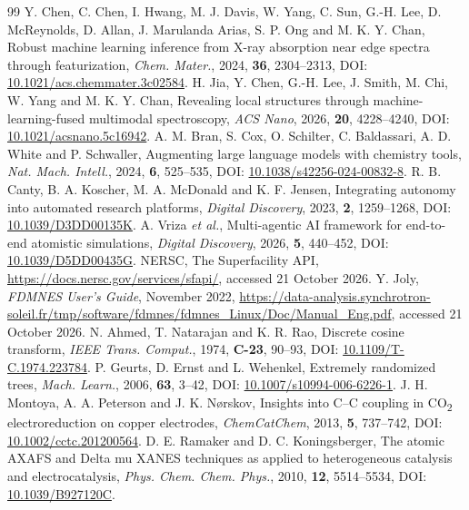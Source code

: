 \begin{thebibliography}{99}
 Y. Chen, C. Chen, I. Hwang, M. J. Davis, W. Yang, C. Sun, G.-H. Lee, D. McReynolds, D. Allan, J. Marulanda Arias, S. P. Ong and M. K. Y. Chan, Robust machine learning inference from X-ray absorption near edge spectra through featurization, \textit{Chem. Mater.}, 2024, \textbf{36}, 2304--2313, DOI: \href{https://doi.org/10.1021/acs.chemmater.3c02584}{10.1021/acs.chemmater.3c02584}.
 H. Jia, Y. Chen, G.-H. Lee, J. Smith, M. Chi, W. Yang and M. K. Y. Chan, Revealing local structures through machine-learning-fused multimodal spectroscopy, \textit{ACS Nano}, 2026, \textbf{20}, 4228--4240, DOI: \href{https://doi.org/10.1021/acsnano.5c16942}{10.1021/acsnano.5c16942}.
 A. M. Bran, S. Cox, O. Schilter, C. Baldassari, A. D. White and P. Schwaller, Augmenting large language models with chemistry tools, \textit{Nat. Mach. Intell.}, 2024, \textbf{6}, 525--535, DOI: \href{https://doi.org/10.1038/s42256-024-00832-8}{10.1038/s42256-024-00832-8}.
 R. B. Canty, B. A. Koscher, M. A. McDonald and K. F. Jensen, Integrating autonomy into automated research platforms, \textit{Digital Discovery}, 2023, \textbf{2}, 1259--1268, DOI: \href{https://doi.org/10.1039/D3DD00135K}{10.1039/D3DD00135K}.
 A. Vriza \textit{et al.}, Multi-agentic AI framework for end-to-end atomistic simulations, \textit{Digital Discovery}, 2026, \textbf{5}, 440--452, DOI: \href{https://doi.org/10.1039/D5DD00435G}{10.1039/D5DD00435G}.
 NERSC, The Superfacility API, \url{https://docs.nersc.gov/services/sfapi/}, accessed 21 October 2026.
 Y. Joly, \textit{FDMNES User's Guide}, November 2022, \url{https://data-analysis.synchrotron-soleil.fr/tmp/software/fdmnes/fdmnes_Linux/Doc/Manual_Eng.pdf}, accessed 21 October 2026.
 N. Ahmed, T. Natarajan and K. R. Rao, Discrete cosine transform, \textit{IEEE Trans. Comput.}, 1974, \textbf{C-23}, 90--93, DOI: \href{https://doi.org/10.1109/T-C.1974.223784}{10.1109/T-C.1974.223784}.
 P. Geurts, D. Ernst and L. Wehenkel, Extremely randomized trees, \textit{Mach. Learn.}, 2006, \textbf{63}, 3--42, DOI: \href{https://doi.org/10.1007/s10994-006-6226-1}{10.1007/s10994-006-6226-1}.
 J. H. Montoya, A. A. Peterson and J. K. N\o rskov, Insights into C--C coupling in CO\textsubscript{2} electroreduction on copper electrodes, \textit{ChemCatChem}, 2013, \textbf{5}, 737--742, DOI: \href{https://doi.org/10.1002/cctc.201200564}{10.1002/cctc.201200564}.
 D. E. Ramaker and D. C. Koningsberger, The atomic AXAFS and Delta mu XANES techniques as applied to heterogeneous catalysis and electrocatalysis, \textit{Phys. Chem. Chem. Phys.}, 2010, \textbf{12}, 5514--5534, DOI: \href{https://doi.org/10.1039/B927120C}{10.1039/B927120C}.

\end{thebibliography}

